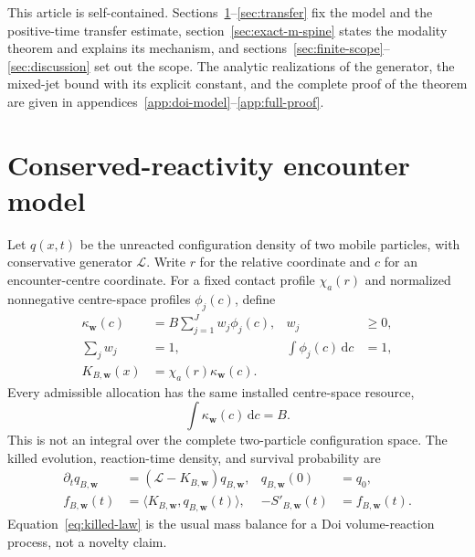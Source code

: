 \documentclass{iopjournal}
\newcommand{\dd}{\mathrm d}
\theoremstyle{plain}
\theoremstyle{definition}
\begin{document}
This article is self-contained.  Sections~\ref{sec:model}--\ref{sec:transfer}
fix the model and the positive-time transfer estimate,
section~\ref{sec:exact-m-spine} states the modality theorem and explains its
mechanism, and sections~\ref{sec:finite-scope}--\ref{sec:discussion} set out
the scope.  The analytic realizations of the generator, the mixed-jet bound
with its explicit constant, and the complete proof of the theorem are given
in appendices~\ref{app:doi-model}--\ref{app:full-proof}.

\section{Conserved-reactivity encounter model}
\label{sec:model}

Let \(q(x,t)\) be the unreacted configuration density of two mobile
particles, with conservative generator \(\mathcal L\).  Write \(r\) for the
relative coordinate and \(c\) for an encounter-centre coordinate.  For a
fixed contact profile \(\chi_a(r)\) and normalized nonnegative centre-space
profiles \(\phi_j(c)\), define
\begin{align}
 \kappa_{\bm w}(c)&=B\sum_{j=1}^{J}w_j\phi_j(c),
 &w_j&\ge0,\nonumber\\
 \sum_jw_j&=1,
 &\int\phi_j(c)\,\dd c&=1,\nonumber\\
 K_{B,\bm w}(x)&=\chi_a(r)\kappa_{\bm w}(c).
 \label{eq:budget-field}
\end{align}
Every admissible allocation has the same installed centre-space resource,
\begin{equation}
 \int\kappa_{\bm w}(c)\,\dd c=B.
 \label{eq:conserved-budget}
\end{equation}
This is not an integral over the complete two-particle configuration space.
The killed evolution, reaction-time density, and survival probability are
\begin{align}
 \partial_tq_{B,\bm w}&=(\mathcal L-K_{B,\bm w})q_{B,\bm w},
 &q_{B,\bm w}(0)&=q_0,\nonumber\\
 f_{B,\bm w}(t)&=\langle K_{B,\bm w},q_{B,\bm w}(t)\rangle,
 &-S'_{B,\bm w}(t)&=f_{B,\bm w}(t).
 \label{eq:killed-law}
\end{align}
Equation~\eqref{eq:killed-law} is the usual mass balance for a Doi
volume-reaction process, not a novelty claim.
\end{document}
